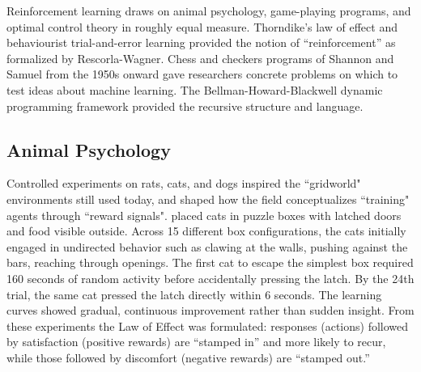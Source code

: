 
Reinforcement learning draws on animal psychology, game-playing programs, and optimal control theory in roughly equal measure. Thorndike's law of effect and behaviourist trial-and-error learning provided the notion of ``reinforcement'' as formalized by Rescorla-Wagner.  Chess and checkers programs of Shannon and Samuel from the 1950s onward gave researchers concrete problems on which to test ideas about machine learning. The Bellman-Howard-Blackwell dynamic programming framework provided the recursive structure and language. 

\subsection{Animal Psychology}

Controlled experiments on rats, cats, and dogs inspired the ``gridworld" environments still used today, and shaped how the field conceptualizes ``training" agents through ``reward signals". \citet{Thorndike1898} placed cats in puzzle boxes with latched doors and food visible outside. Across 15 different box configurations, the cats initially engaged in undirected behavior such as clawing at the walls, pushing against the bars, reaching through openings. The first cat to escape the simplest box required 160 seconds of random activity before accidentally pressing the latch. By the 24th trial, the same cat pressed the latch directly within 6 seconds. The learning curves showed gradual, continuous improvement rather than sudden insight. From these experiments the Law of Effect was formulated: responses (actions) followed by satisfaction (positive rewards) are ``stamped in'' and more likely to recur, while those followed by discomfort (negative rewards) are ``stamped out.''


